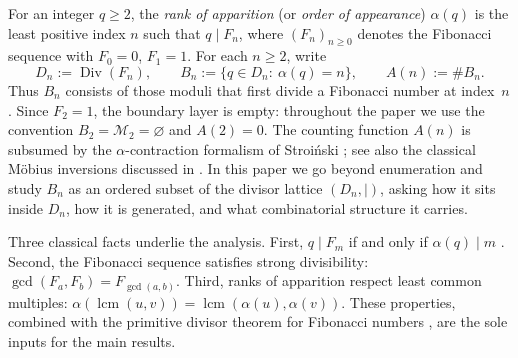 \documentclass[11pt,letterpaper]{article}
\numberwithin{equation}{section}
\theoremstyle{plain}
\theoremstyle{definition}
\theoremstyle{remark}
\DeclareMathOperator{\lcmop}{lcm}
\begin{document}
For an integer $q\ge 2$, the \emph{rank of apparition} (or \emph{order of
appearance}) $\alpha(q)$ is the least positive index $n$ such that $q\mid
F_n$, where $(F_n)_{n\ge 0}$ denotes the Fibonacci sequence with $F_0=0$,
$F_1=1$. For each $n\ge 2$, write
\[
D_n:=\operatorname{Div}(F_n),
\qquad
B_n:=\{q\in D_n:\ \alpha(q)=n\},
\qquad
A(n):=\#B_n.
\]
Thus $B_n$ consists of those moduli that first divide a Fibonacci number at
index~$n$. Since $F_2=1$, the boundary layer is empty: throughout the paper
we use the convention $B_2=\mathcal M_2=\varnothing$ and $A(2)=0$.
The counting function $A(n)$ is subsumed by the
$\alpha$-contraction formalism of Stroi\'nski \cite{Stroinski2016AlphaContraction};
see also the classical M\"obius inversions discussed in
\cite{Halton1966DivisibilityFibonacci,FultonMorris1969ArithmeticalFunctions}.
In this paper we go beyond enumeration and study $B_n$ as an
ordered subset of the divisor lattice $(D_n,\mid)$, asking how it sits inside
$D_n$, how it is generated, and what combinatorial structure it carries.

Three classical facts underlie the analysis. First, $q\mid F_m$ if and only if
$\alpha(q)\mid m$
\cite{Wall1960FibonacciModm,Vinson1963RankApparition}. Second, the Fibonacci
sequence satisfies strong divisibility: $\gcd(F_a,F_b)=F_{\gcd(a,b)}$.
Third, ranks of apparition respect least common multiples:
$\alpha(\lcmop(u,v))=\lcmop(\alpha(u),\alpha(v))$. These properties, combined
with the primitive divisor theorem for Fibonacci numbers
\cite{Carmichael1913PrimitiveDivisors,BiluHanrotVoutier2001PrimitiveDivisorsLucas},
are the sole inputs for the main results.
\end{document}
